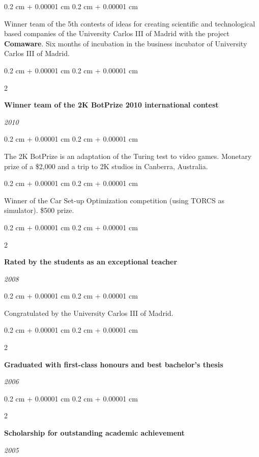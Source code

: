 \documentclass[10pt, letterpaper]{article}
\newenvironment{onecolentry}{
	\begin{adjustwidth}{
		0.2 cm + 0.00001 cm
	}{
		0.2 cm + 0.00001 cm
	}
	}{
	\end{adjustwidth}
} %
\newenvironment{twocolentry}[2][]{
	\onecolentry
	\def\secondColumn{#2}
	\setcolumnwidth{\fill, 5.5 cm}
	\begin{paracol}{2}
	}{
		\switchcolumn \raggedleft \secondColumn
	\end{paracol}
	\endonecolentry
} %
\begin{document}
	\vspace{0.10 cm}
	\begin{onecolentry}
		Winner team of the 5th contests of ideas for creating scientific and technological based companies of the University Carlos III of Madrid with the project \textbf{Comaware}. Six months of incubation in the business incubator of University Carlos III of Madrid.
	\end{onecolentry}

	\vspace{0.2 cm}

	\begin{twocolentry}{
		\textit{2010}}
		\textbf{Winner team of the 2K BotPrize 2010 international contest}
	\end{twocolentry}

	\vspace{0.10 cm}
	\begin{onecolentry}
		The 2K BotPrize is an adaptation of the Turing test to video games. Monetary prize of a \$2,000 and a trip to 2K studios in Canberra, Australia.
	\end{onecolentry}

	\vspace{0.10 cm}
	\begin{onecolentry}
		Winner of the Car Set-up Optimization competition (using TORCS as simulator). \$500 prize.
	\end{onecolentry}

	\vspace{0.2 cm}

	\begin{twocolentry}{
		\textit{2008}}
		\textbf{Rated by the students as an exceptional teacher}
	\end{twocolentry}

	\vspace{0.10 cm}
	\begin{onecolentry}
		Congratulated by the University Carlos III of Madrid.
	\end{onecolentry}

	\vspace{0.2 cm}

	\begin{twocolentry}{
		\textit{2006}}
		\textbf{Graduated with first-class honours and best bachelor's thesis}
	\end{twocolentry}

	\vspace{0.2 cm}

	\begin{twocolentry}{
		\textit{2005}}
		\textbf{Scholarship for outstanding academic achievement}
	\end{twocolentry}
\end{document}
